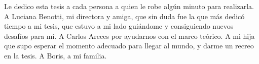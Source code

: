 
\vspace*{\fill}


Le dedico esta tesis a cada persona a quien le robe alg\'un minuto para realizarla. A Luciana Benotti, mi directora y amiga, que sin duda fue la que m\'as dedic\'o tiempo a mi tesis, que estuvo a mi lado gui\'andome y consiguiendo nuevos desaf\'ios para m\'i. A Carlos Areces por ayudarnos con el marco te\'orico. A mi hija que supo esperar el momento adecuado para llegar al mundo, y darme un recreo en la tesis. A Boris, a mi familia. 


\vspace{\fill}
